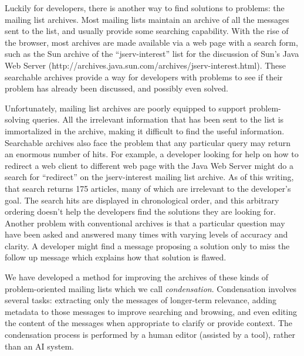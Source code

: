 Luckily for developers, there is another way to find solutions to problems: the
mailing list archives. Most mailing lists maintain an archive of all the
messages sent to the list, and usually provide some searching capability. With
the rise of the browser, most archives are made available via a web page with a
search form, such as the Sun archive of the ``jserv-interest'' list for the
discussion of Sun's Java Web Server
(http://archives.java.sun.com/\linebreak[0]archives/\linebreak[0]jserv-interest.html).
These searchable archives provide a way for developers with problems to see if
their problem has already been discussed, and possibly even solved.

Unfortunately, mailing list archives are poorly equipped to support
problem-solving queries. All the irrelevant information that has been sent to
the list is immortalized in the archive, making it difficult to find the useful
information. Searchable archives also face the problem that any particular
query may return an enormous number of hits. For example, a developer looking
for help on how to redirect a web client to different web page with the Java
Web Server might do a search for ``redirect'' on the jserv-interest mailing
list archive. As of this writing, that search returns 175 articles, many of
which are irrelevant to the developer's goal. The search hits are displayed in
chronological order, and this arbitrary ordering doesn't help the developers
find the solutions they are looking for. Another problem with conventional
archives is that a particular question may have been asked and answered many
times with varying levels of accuracy and clarity. A developer might find a
message proposing a solution only to miss the follow up message which explains
how that solution is flawed.

We have developed a method for improving the archives of these kinds of
problem-oriented mailing lists which we call {\em condensation}. Condensation
involves several tasks: extracting only the messages of longer-term relevance,
adding metadata to those messages to improve searching and browsing, and even
editing the content of the messages when appropriate to clarify or provide
context. The condensation process is performed by a human editor (assisted by a
tool), rather than an AI system.

